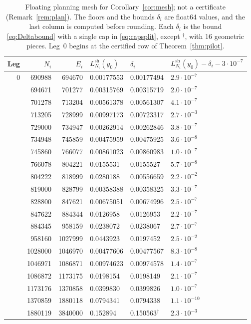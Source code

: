 \documentclass[11pt]{article}
\theoremstyle{remark}
\numberwithin{equation}{section}
\begin{document}
\begin{table}[!t]
\centering
\small
\begin{tabular}{rrrlll}
\toprule
Leg & $N_i$ & $E_i$ & $L^{\mathrm{sh}}_{N_i}(y_0)$ & $\delta_i$ &
 $L^{\mathrm{sh}}_{N_i}(y_0)-\delta_i-3\cdot10^{-7}$\\
\midrule
0 & 690988 & 694670 & 0.00177553 & 0.00177494 & $2.9\cdot10^{-7}$\\
 & 694671 & 701277 & 0.00315769 & 0.00315719 & $2.0\cdot10^{-7}$\\
 & 701278 & 713204 & 0.00561378 & 0.00561307 & $4.1\cdot10^{-7}$\\
 & 713205 & 728999 & 0.00997173 & 0.00723317 & $2.7\cdot10^{-3}$\\
\addlinespace
1 & 729000 & 734947 & 0.00262914 & 0.00262846 & $3.8\cdot10^{-7}$\\
 & 734948 & 745859 & 0.00475959 & 0.00475925 & $3.6\cdot10^{-8}$\\
 & 745860 & 766077 & 0.00861023 & 0.00860983 & $1.0\cdot10^{-7}$\\
 & 766078 & 804221 & 0.0155531 & 0.0155527 & $5.7\cdot10^{-8}$\\
 & 804222 & 818999 & 0.0280188 & 0.00556659 & $2.2\cdot10^{-2}$\\
\addlinespace
2 & 819000 & 828799 & 0.00358388 & 0.00358325 & $3.3\cdot10^{-7}$\\
 & 828800 & 847621 & 0.00675051 & 0.00674996 & $2.5\cdot10^{-7}$\\
 & 847622 & 884344 & 0.0126958 & 0.0126953 & $2.2\cdot10^{-7}$\\
 & 884345 & 958159 & 0.0238072 & 0.0238067 & $2.7\cdot10^{-7}$\\
 & 958160 & 1027999 & 0.0443923 & 0.0197452 & $2.5\cdot10^{-2}$\\
\addlinespace
3 & 1028000 & 1046970 & 0.00477606 & 0.00477567 & $8.3\cdot10^{-8}$\\
 & 1046971 & 1086871 & 0.00974623 & 0.00974578 & $1.4\cdot10^{-7}$\\
 & 1086872 & 1173175 & 0.0198154 & 0.0198149 & $2.1\cdot10^{-7}$\\
 & 1173176 & 1370858 & 0.0399830 & 0.0399826 & $1.0\cdot10^{-7}$\\
 & 1370859 & 1880118 & 0.0794341 & 0.0794338 & $1.1\cdot10^{-10}$\\
 & 1880119 & 3840000 & 0.152894 & 0.150563$^{\dagger}$ & $2.3\cdot10^{-3}$\\
\bottomrule
\end{tabular}
\caption{Floating planning mesh for Corollary~\ref{cor:mesh}; not a
certificate (Remark~\ref{rem:plan}). The floors and the bounds $\delta_i$
are float64 values, and the last column is computed before rounding. Each
$\delta_i$ is the bound \eqref{eq:Deltabound} with a single cap in
\eqref{eq:capsplit}, except $^{\dagger}$, with 16 geometric pieces. Leg~0
begins at the certified row of Theorem~\ref{thm:pilot}.}
\label{tab:plan}
\end{table}
\end{document}
